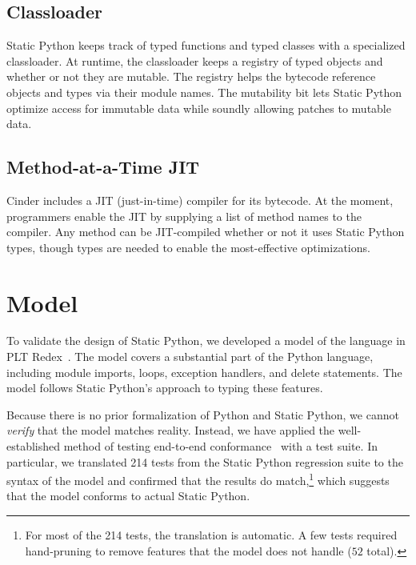 \documentclass[english,cleveref,submission]{programming}
\newcommand{\SP}{Static Python}
\newcommand{\totalnum}[1]{$#1$ total}
\begin{document}
\subsection{Classloader}
\label{s:classloader}

\SP{} keeps track of typed functions and typed classes with a specialized classloader.
At runtime, the classloader keeps a registry of typed objects and whether or not they
are mutable.
The registry helps the bytecode reference objects and types via their module names.
The mutability bit lets \SP{} optimize access for immutable data while soundly allowing
patches to mutable data.


\subsection{Method-at-a-Time JIT}
\label{s:jit}

Cinder includes a JIT (just-in-time) compiler for its bytecode.
At the moment, programmers enable the JIT by supplying a list of method names
to the compiler.
Any method can be JIT-compiled whether or not it uses \SP{} types,
though types are needed to enable the most-effective optimizations.



\section{Model}
\label{s:model}

To validate the design of \SP{}, we developed a model of the language in PLT
Redex~\cite{kcdeffmrtf-popl-2012}.
The model covers a substantial part of the Python language, including
module imports, loops, exception handlers, and delete statements.
The model follows \SP{}'s approach to typing these features.

Because there is no prior formalization of Python and \SP{}, we cannot
\emph{verify} that the model matches reality.
Instead, we have applied the well-established method of testing end-to-end
conformance~\cite{gsk-ecoop-2010,gclpk-dls-2012,pmmwplck-oopsla-2013,bcfgmnss-popl-2014,fgpssmds-popl-2016}
with a test suite.
In particular, we translated 214 tests from the \SP{} regression suite to the
syntax of the model and confirmed that the results
do match,\footnote{For most of the 214 tests, the translation is automatic.
  A few tests required hand-pruning to remove features that the model
  does not handle (\totalnum{52}).}
which suggests that the model conforms to actual \SP{}.
\end{document}
